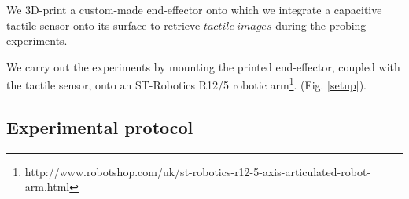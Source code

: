 \documentclass[]{interact}
\theoremstyle{plain}%
\theoremstyle{definition}
\theoremstyle{remark}
\begin{document}
We 3D-print a custom-made end-effector onto which we integrate a capacitive tactile sensor onto its surface to retrieve $tactile\ images$ during the probing experiments.

 


We carry out the experiments by mounting the printed end-effector, coupled with the tactile sensor, onto an ST-Robotics R12/5 robotic arm\footnote[3]{http://www.robotshop.com/uk/st-robotics-r12-5-axis-articulated-robot-arm.html}.  (Fig. \ref{setup}). 








\subsection{Experimental protocol} \label{sec_experimental_protocol}

%
%
%
\end{document}
